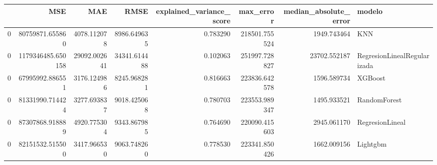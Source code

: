 \begin{tabular}{lrrrrrrl}
\toprule
 & MSE & MAE & RMSE & explained_variance_score & max_error & median_absolute_error & modelo \\
\midrule
0 & 80759871.655860 & 4078.112078 & 8986.649635 & 0.783290 & 218501.755524 & 1949.743464 & KNN \\
0 & 1179346485.650158 & 29092.002641 & 34341.614488 & 0.102063 & 251997.728827 & 23702.552187 & RegresionLinealRegularizada \\
0 & 67995992.886551 & 3176.124986 & 8245.968281 & 0.816663 & 223836.642578 & 1596.589734 & XGBoost \\
0 & 81331990.714424 & 3277.693837 & 9018.425068 & 0.780703 & 223553.989347 & 1495.933521 & RandomForest \\
0 & 87307868.918889 & 4920.775304 & 9343.867985 & 0.764690 & 220090.415603 & 2945.061170 & RegresionLineal \\
0 & 82151532.515500 & 3417.966530 & 9063.748260 & 0.778530 & 223341.850426 & 1662.009156 & Lightgbm \\
\bottomrule
\end{tabular}
